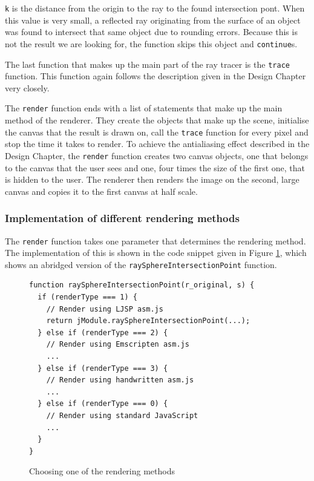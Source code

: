 \documentclass[11pt]{report}
\begin{document}
\texttt{k} is the distance from the origin to the ray to the found intersection pont. When this value is very small, a reflected ray originating from the surface of an object was found to intersect that same object due to rounding errors. Because this is not the result we are looking for, the function skips this object and \texttt{continue}s.

The last function that makes up the main part of the ray tracer is the \texttt{trace} function. This function again follows the description given in the Design Chapter very closely.

The \texttt{render} function ends with a list of statements that make up the main method of the renderer. They create the objects that make up the scene, initialise the canvas that the result is drawn on, call the \texttt{trace} function for every pixel and stop the time it takes to render. To achieve the antialiasing effect described in the Design Chapter, the \texttt{render} function creates two canvas objects, one that belongs to the canvas that the user sees and one, four times the size of the first one, that is hidden to the user. The renderer then renders the image on the second, large canvas and copies it to the first canvas at half scale. 

\subsubsection{Implementation of different rendering methods}

The \texttt{render} function takes one parameter that determines the rendering method. The implementation of this is shown in the code snippet given in Figure \ref{irenderer2}, which shows an abridged version of the \texttt{raySphereIntersectionPoint} function.

\begin{figure}[ht]
\begin{lstlisting}
function raySphereIntersectionPoint(r_original, s) {
  if (renderType === 1) {
    // Render using LJSP asm.js
    return jModule.raySphereIntersectionPoint(...);
  } else if (renderType === 2) {
    // Render using Emscripten asm.js
    ...
  } else if (renderType === 3) {
    // Render using handwritten asm.js
    ...
  } else if (renderType === 0) {
    // Render using standard JavaScript
    ...
  }
}
\end{lstlisting}
\caption{Choosing one of the rendering methods}
\label{irenderer2}
\end{figure}
\end{document}
